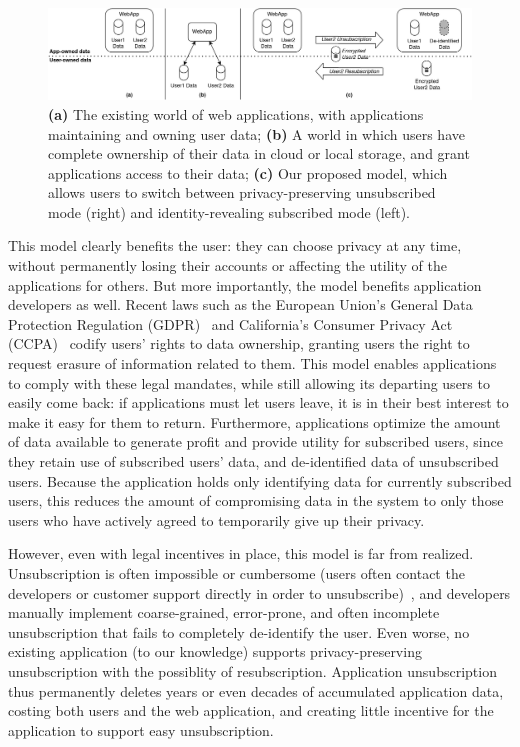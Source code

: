 \begin{figure}[ht!]
    \centering
    \includegraphics[width=\textwidth]{img/worlds}

    \caption{\textbf{(a)} The existing world of web applications, with applications maintaining and
    owning user data; \textbf{(b)} A world in which users have complete ownership of their data in cloud or local
    storage, and grant applications access to their data;
    \textbf{(c)} Our proposed model, which allows users to switch between privacy-preserving unsubscribed
    mode (right) and identity-revealing subscribed mode (left).}
    \label{fig:world}
\end{figure}

This model clearly benefits the user: they can choose privacy at any time, without permanently
losing their accounts or affecting the utility of the applications for others.  But more
importantly, the model benefits application developers as well. Recent laws such as the European
Union's General Data Protection Regulation (GDPR)~\cite{eu:gdpr} and California's Consumer Privacy
Act (CCPA)~\cite{ca:privacy-act} codify users' rights to data ownership, granting users the right to
request erasure of information related to them. This model enables applications to comply with these
legal mandates, while still allowing its departing users to easily come back: if applications must
let users leave, it is in their best interest to make it easy for them to return. Furthermore,
applications optimize the amount of data available to generate profit and provide utility for
subscribed users, since they retain use of subscribed users' data, and de-identified data of
unsubscribed users. Because the application holds only identifying data for currently subscribed
users, this reduces the amount of compromising data in the system to only those users who have
actively agreed to temporarily give up their privacy.

However, even with legal incentives in place, this model is far from realized. Unsubscription is
often impossible or cumbersome (users often contact the developers or customer support directly in
order to unsubscribe)~\cite{jdm}, and developers manually implement coarse-grained, error-prone, and
often incomplete unsubscription that fails to completely de-identify the user. Even worse, no existing
application (to our knowledge) supports privacy-preserving unsubscription with the possiblity of
resubscription.  Application unsubscription thus permanently deletes years or even decades of
accumulated application data, costing both users and the web application, and creating little
incentive for the application to support easy unsubscription. 

